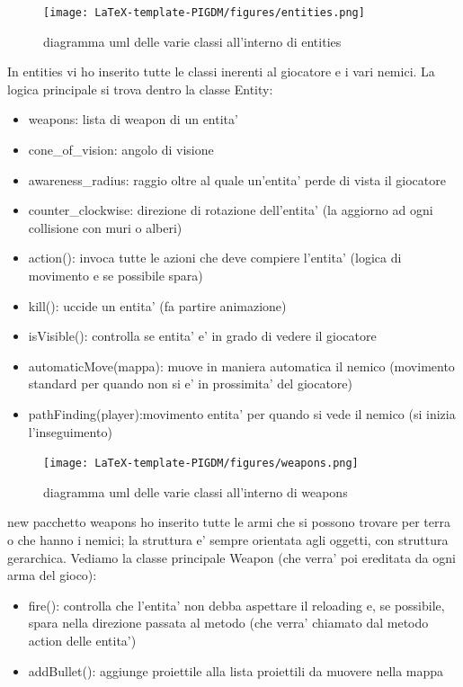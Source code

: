\documentclass[12pt,a4paper]{report}
\begin{document}
\begin{figure}[h]
    \centering
    \texttt{[image: LaTeX-template-PIGDM/figures/entities.png]}
    \caption{diagramma uml delle varie classi all'interno di entities}
    \label{fig:enter-label}
\end{figure}
In entities vi ho inserito tutte le classi inerenti al giocatore e i vari nemici. La logica principale si trova dentro la classe Entity:

 
\begin{itemize}
\item weapons: lista di weapon di un entita' 
\item cone\_of\_vision: angolo di visione
\item awareness\_radius: raggio oltre al quale un'entita' perde di vista il giocatore
\item counter\_clockwise: direzione di rotazione dell'entita' (la aggiorno ad ogni collisione con muri o alberi)
\end{itemize}
\begin{itemize}
\item action(): invoca tutte le azioni che deve compiere l'entita' (logica di movimento e se possibile spara)
\item kill(): uccide un entita' (fa partire animazione)
\item isVisible(): controlla se entita' e' in grado di vedere il giocatore
\item automaticMove(mappa): muove in maniera automatica il nemico (movimento standard per quando non si e' in prossimita' del giocatore)
\item pathFinding(player):movimento entita' per quando si vede il nemico (si inizia l'inseguimento)
\end{itemize}


\begin{figure}[h]
    \centering
    \texttt{[image: LaTeX-template-PIGDM/figures/weapons.png]}
    \caption{diagramma uml delle varie classi all'interno di weapons}
    \label{fig:enter-label}
\end{figure}
new pacchetto weapons ho inserito tutte le armi che si possono trovare per terra o che hanno i nemici; la struttura e' sempre orientata agli oggetti, con struttura gerarchica. Vediamo la classe principale Weapon (che verra' poi ereditata da ogni arma del gioco):
 
\begin{itemize}
\item fire(): controlla che l'entita' non debba aspettare il reloading e, se possibile, spara nella direzione passata al metodo (che verra' chiamato dal metodo action delle entita')
\item addBullet(): aggiunge proiettile alla lista proiettili da muovere nella mappa
\end{itemize}
\end{document}
